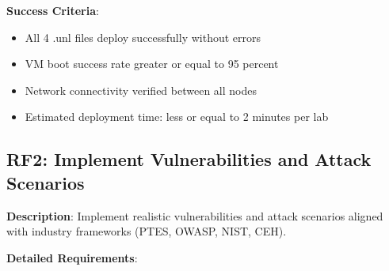 \textbf{Success Criteria}:
\begin{itemize}
\item All 4 .unl files deploy successfully without errors
\item VM boot success rate greater or equal to 95 percent
\item Network connectivity verified between all nodes
\item Estimated deployment time: less or equal to 2 minutes per lab
\end{itemize}

\subsection{RF2: Implement Vulnerabilities and Attack Scenarios}

\textbf{Description}: Implement realistic vulnerabilities and attack scenarios aligned with industry frameworks (PTES\cite{ptes}, OWASP\cite{owasp_testing_guide}, NIST\cite{nist_framework}, CEH\cite{ceh_framework}).

\textbf{Detailed Requirements}:

